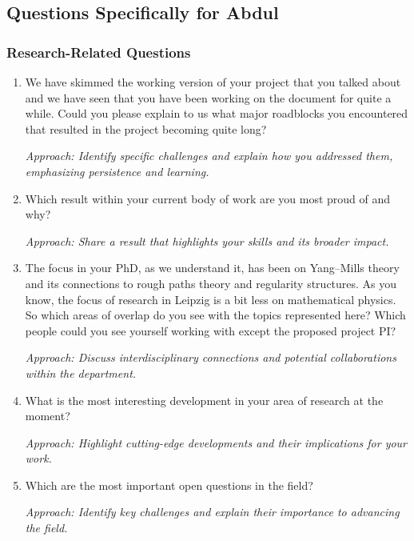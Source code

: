 \documentclass[12pt]{article}
\numberwithin{equation}{section}
\begin{document}
\subsection{Questions Specifically for Abdul}
\subsubsection{Research-Related Questions}
\begin{enumerate}
    \item We have skimmed the working version of your project that you talked about and we have seen that you have been working on the document for quite a while. Could you please explain to us what major roadblocks you encountered that resulted in the project becoming quite long?
    
    \textit{Approach: Identify specific challenges and explain how you addressed them, emphasizing persistence and learning.}

    \item Which result within your current body of work are you most proud of and why?
    
    \textit{Approach: Share a result that highlights your skills and its broader impact.}

    \item The focus in your PhD, as we understand it, has been on Yang–Mills theory and its connections to rough paths theory and regularity structures. As you know, the focus of research in Leipzig is a bit less on mathematical physics. So which areas of overlap do you see with the topics represented here? Which people could you see yourself working with except the proposed project PI?
    
    \textit{Approach: Discuss interdisciplinary connections and potential collaborations within the department.}

    \item What is the most interesting development in your area of research at the moment?
    
    \textit{Approach: Highlight cutting-edge developments and their implications for your work.}

    \item Which are the most important open questions in the field?
    
    \textit{Approach: Identify key challenges and explain their importance to advancing the field.}
\end{enumerate}
\end{document}

